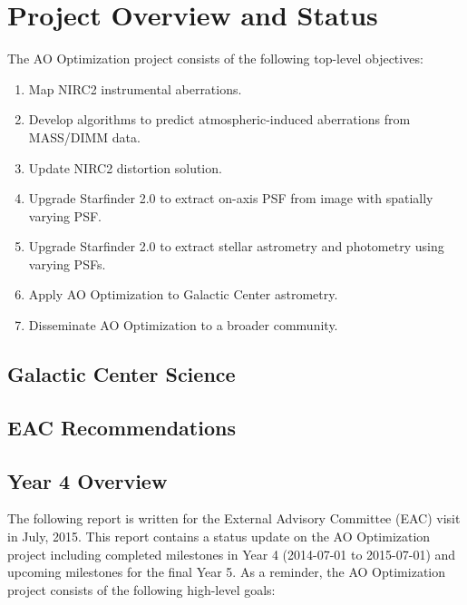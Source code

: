 \section{Project Overview and Status}
\label{sec:overview}

The AO Optimization project consists of the following top-level
objectives:

\begin{enumerate}
\item Map NIRC2 instrumental aberrations.
\item Develop algorithms to predict atmospheric-induced aberrations
  from MASS/DIMM data.
\item Update NIRC2 distortion solution.
\item Upgrade Starfinder 2.0 to extract on-axis PSF from image with
  spatially varying PSF.
\item Upgrade Starfinder 2.0 to extract stellar astrometry and
  photometry using varying PSFs.
\item Apply AO Optimization to Galactic Center astrometry.
\item Disseminate AO Optimization to a broader community.
\end{enumerate}



\subsection{Galactic Center Science}


\subsection{EAC Recommendations}

\subsection{Year 4 Overview}
The following report is written for the External Advisory Committee (EAC) visit in July, 2015. This report contains a status update on the AO Optimization project including completed milestones in Year 4 (2014-07-01 to 2015-07-01) and upcoming milestones for the final Year 5. As a reminder, the AO Optimization project consists of the following high-level goals:

  
  